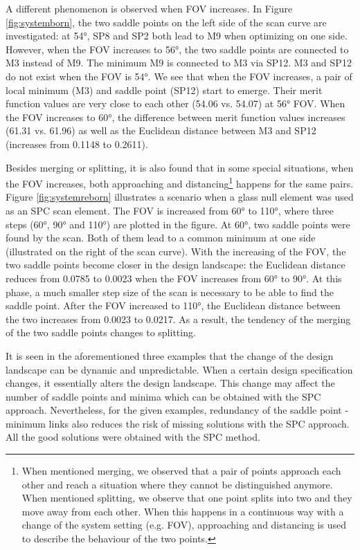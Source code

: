 A different phenomenon is observed when FOV increases. In Figure \ref{fig:systemborn}, the two saddle points on the left side of the scan curve are investigated: at 54°, SP8 and SP2 both lead to M9 when optimizing on one side. However, when the FOV increases to 56°, the two saddle points are connected to M3 instead of M9. The minimum M9 is connected to M3 via SP12. M3 and SP12 do not exist when the FOV is 54°. We see that when the FOV increases, a pair of local minimum (M3) and saddle point (SP12) start to emerge. Their merit function values are very close to each other (54.06 vs. 54.07) at 56° FOV. When the FOV increases to 60°, the difference between merit function values increases (61.31 vs. 61.96) as well as the Euclidean distance between M3 and SP12 (increases from 0.1148 to 0.2611). 

Besides merging or splitting, it is also found that in some special situations, when the FOV increases, both approaching and distancing\footnote{When mentioned merging, we observed that a pair of points approach each other and reach a situation where they cannot be distinguished anymore. When mentioned splitting, we observe that one point splits into two and they move away from each other. When this happens in a continuous way with a change of the system setting (e.g. FOV), approaching and distancing is used to describe the behaviour of the two points.} happens for the same pairs. Figure \ref{fig:systemreborn} illustrates a scenario when a glass null element was used as an SPC scan element. The FOV is increased from 60° to 110°, where three steps (60°, 90° and 110°) are plotted in the figure. At 60°, two saddle points were found by the scan. Both of them lead to a common minimum at one side (illustrated on the right of the scan curve). With the increasing of the FOV, the two saddle points become closer in the design landscape: the Euclidean distance reduces from 0.0785 to 0.0023 when the FOV increases from 60° to 90°. At this phase, a much smaller step size of the scan is necessary to be able to find the saddle point. After the FOV increased to 110°, the Euclidean distance between the two increases from 0.0023 to 0.0217. As a result, the tendency of the merging of the two saddle points changes to splitting. 

It is seen in the aforementioned three examples that the change of the design landscape can be dynamic and unpredictable. When a certain design specification changes, it essentially alters the design landscape. This change may affect the number of saddle points and minima which can be obtained with the SPC approach. Nevertheless, for the given examples, redundancy of the saddle point - minimum links also reduces the risk of missing solutions with the SPC approach. All the good solutions were obtained with the SPC method.

